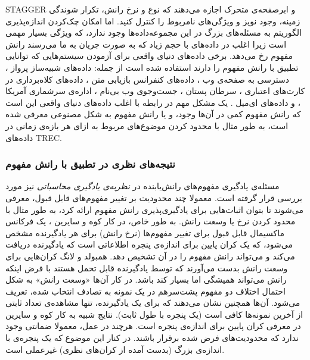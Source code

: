 STAGGER 
و ابرصفحه‌ی متحرک اجازه می‌دهند که نوع و نرخ رانش، تکرار شوندگی زمینه، وجود نویز و ویژگی‌های نامربوط را کنترل کنید. اما امکان چک‌کردن
اندازه‌پذیری
الگوریتم به مسئله‌های بزرگ در این مجموعه‌داده‌ها وجود ندارد، که ویژگی بسیار مهمی است زیرا اغلب در داده‌های با حجم زیاد که به صورت جریان
به ما می‌رسند رانش مفهوم رخ می‌دهد. برخی داده‌های دنیای واقعی برای آزمودن سیستم‌هایی که توانایی تطبیق با رانش مفهوم را دارند استفاده شده است از جمله: داده‌های شبیه‌ساز پرواز
\cite{harriessammut1998}، 
دسترسی به صفحه‌ی وب
\cite{hultenetal2001}، 
داده‌های کنفرانس بازیابی متن
 \cite{lanquillonrenz1999} \cite{klinkenberg2004}، 
داده‌های کلاه‌برداری در کارت‌های اعتباری
\cite{wangetal2003}، 
سرطان پستان
، 
جست‌وجوی وب بی‌نام
، 
اداره‌ی سرشماری آمریکا
\cite{streetkim2001}، 
و داده‌های ای‌میل
\cite{cunninghametal2003}. 
یک مشکل مهم در رابطه با اغلب داده‌های دنیای واقعی این است که رانش مفهوم کمی در آن‌ها وجود، و یا رانش مفهوم به شکل مصنوعی معرفی شده است، به طور مثال با محدود کردن موضوع‌های مربوط به ازای هر بازه‌ی زمانی در داده‌های 
TREC.

\subsubsection{
نتیجه‌های نظری در تطبیق با رانش مفهوم
}
مسئله‌ی یادگیری مفهوم‌های رانش‌یابنده در 
\textit{
نظریه‌ی یادگیری محاسباتی
}
نیز مورد بررسی قرار گرفته است. معمولا چند محدودیت بر تغییر مفهوم‌های قابل قبول، معرفی می‌شوند تا بتوان اثبات‌هایی برای یادگیری‌پذیری
رانش مفهوم ارائه کرد، به طور مثال با محدود کردن نرخ یا وسعت
رانش. به طور خاص، در کار کوه و سایرین
\cite{kuhetal1991}، 
یک فرکانس ماکسیمال
قابل قبول برای تغییر مفهوم‌ها (نرخ رانش) برای هر یادگیرنده مشخص می‌شود، که یک کران پایین
برای اندازه‌ی پنجره اطلاعاتی است که یادگیرنده دریافت می‌کند و می‌تواند رانش مفهوم را در آن تشخیص دهد. همبولد و لانگ
\cite{hemboldlong1994} 
کران‌هایی برای وسعت رانش بدست می‌آورند که توسط یادگیرنده قابل تحمل هستند با فرض اینکه رانش می‌تواند همیشگی اما بسیار کند باشد. در کار آن‌ها «وسعت رانش» به شکل احتمال اختلاف دو مفهوم پشت‌سرهم در یک نمونه به تصادف انتخاب شده، تعریف می‌شود. آن‌ها همچنین نشان می‌دهند که برای یک یادگیرنده، تنها مشاهده‌ی تعداد ثابتی از آخرین نمونه‌ها کافی است (یک پنجره با طول ثابت). نتایج شبیه به کار کوه و سایرین در معرفی کران پایین برای اندازه‌ی پنجره است. هرچند در عمل، معمولا ضمانتی وجود ندارد که محدودیت‌های فرض شده برقرار باشند. در کنار این موضوع که یک پنجره‌ی با اندازه‌ی بزرگ (بدست آمده از کران‌های نظری) غیرعملی است.



